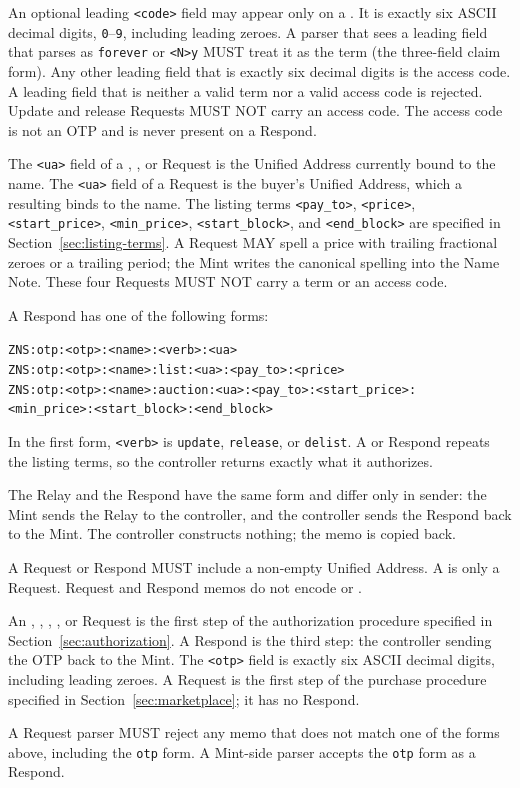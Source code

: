 An optional leading \texttt{<code>} field may appear only on a . It is exactly six ASCII decimal digits, \texttt{0}--\texttt{9}, including leading zeroes. A parser that sees a leading field that parses as \texttt{forever} or \texttt{<N>y} MUST treat it as the term (the three-field claim form). Any other leading field that is exactly six decimal digits is the access code. A leading field that is neither a valid term nor a valid access code is rejected. Update and release Requests MUST NOT carry an access code. The access code is not an OTP and is never present on a Respond.

The \texttt{<ua>} field of a , , or  Request is the Unified Address currently bound to the name. The \texttt{<ua>} field of a  Request is the buyer's Unified Address, which a resulting  binds to the name. The listing terms \texttt{<pay\_to>}, \texttt{<price>}, \texttt{<start\_price>}, \texttt{<min\_price>}, \texttt{<start\_block>}, and \texttt{<end\_block>} are specified in Section~\ref{sec:listing-terms}. A Request MAY spell a price with trailing fractional zeroes or a trailing period; the Mint writes the canonical spelling into the Name Note. These four Requests MUST NOT carry a term or an access code.

A Respond has one of the following forms:

\begin{center}
\texttt{ZNS:otp:<otp>:<name>:<verb>:<ua>}\\
\texttt{ZNS:otp:<otp>:<name>:list:<ua>:<pay\_to>:<price>}\\
\texttt{ZNS:otp:<otp>:<name>:auction:<ua>:<pay\_to>:<start\_price>:}\\
\texttt{<min\_price>:<start\_block>:<end\_block>}
\end{center}

In the first form, \texttt{<verb>} is \texttt{update}, \texttt{release}, or \texttt{delist}. A  or  Respond repeats the listing terms, so the controller returns exactly what it authorizes.

The Relay and the Respond have the same form and differ only in sender: the Mint sends the Relay to the controller, and the controller sends the Respond back to the Mint. The controller constructs nothing; the memo is copied back.

A Request or Respond MUST include a non-empty Unified Address. A  is only a Request. Request and Respond memos do not encode  or .

An , , , , or  Request is the first step of the authorization procedure specified in Section~\ref{sec:authorization}. A Respond is the third step: the controller sending the OTP back to the Mint. The \texttt{<otp>} field is exactly six ASCII decimal digits, including leading zeroes. A  Request is the first step of the purchase procedure specified in Section~\ref{sec:marketplace}; it has no Respond.

A Request parser MUST reject any memo that does not match one of the forms above, including the \texttt{otp} form. A Mint-side parser accepts the \texttt{otp} form as a Respond.
